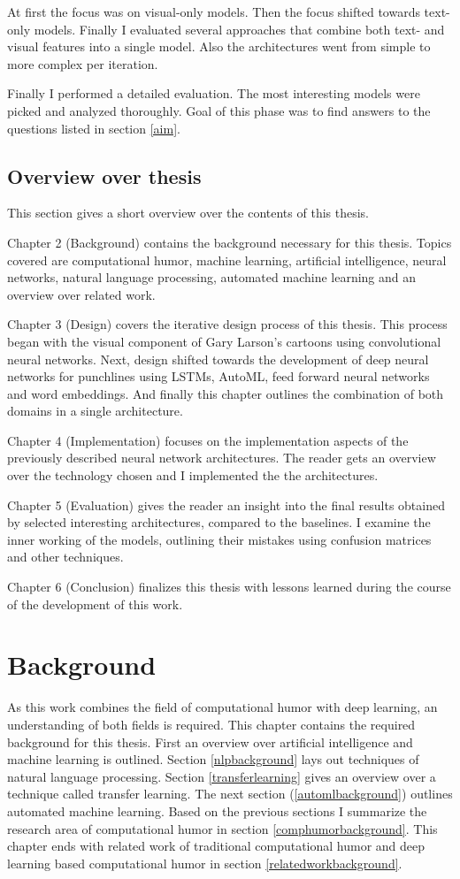 \documentclass[draft,final,oneside]{vutinfth} %
\begin{document}
At first the focus was on visual-only models. Then the focus shifted towards text-only models. Finally I evaluated several approaches that combine both text- and visual features into a single model. Also the architectures went from simple to more complex per iteration.

Finally I performed a detailed evaluation. The most interesting models were picked and analyzed thoroughly. Goal of this phase was to find answers to the questions listed in section \ref{aim}.
\section{Overview over thesis}
This section gives a short overview over the contents of this thesis.

Chapter 2 (Background) contains the background necessary for this thesis. Topics covered are computational humor, machine learning, artificial intelligence, neural networks, natural language processing, automated machine learning and an overview over related work.

Chapter 3 (Design) covers the iterative design process of this thesis. This process began with the visual component of Gary Larson's cartoons using convolutional neural networks. Next, design shifted towards the development of deep neural networks for punchlines using LSTMs, AutoML, feed forward neural networks and word embeddings. And finally this chapter outlines the combination of both domains in a single architecture.

Chapter 4 (Implementation) focuses on the implementation aspects of the previously described neural network architectures. The reader gets an overview over the technology chosen and I implemented the the architectures.

Chapter 5 (Evaluation) gives the reader an insight into the final results obtained by selected interesting architectures, compared to the baselines. I examine the inner working of the models, outlining their mistakes using confusion matrices and other techniques.

Chapter 6 (Conclusion) finalizes this thesis with lessons learned during the course of the development of this work. 


\chapter{Background}

As this work combines the field of computational humor with deep learning, an understanding of both fields is required. This chapter contains the required background for this thesis. First an overview over artificial intelligence and machine learning is outlined. Section \ref{nlpbackground} lays out techniques of natural language processing. Section \ref{transferlearning} gives an overview over a technique called transfer learning. The next section (\ref{automlbackground}) outlines automated machine learning. Based on the previous sections I summarize the research area of computational humor in section \ref{comphumorbackground}. This chapter ends with related work of traditional computational humor and deep learning based computational humor in section \ref{relatedworkbackground}.
\end{document}
